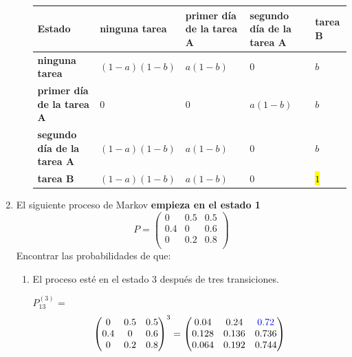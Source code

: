 \documentclass{templateNote}
\begin{document}
\begin{enumerate}[start = 3]
\begin{enumerate}[label = \alph*)]
\begin{center}
            \begin{table}[h]
                \centering
                \begin{tabularx}{\textwidth}{|X|X|X|X|X|}
                    \hline
                    \textbf{Estado} & \textbf{ninguna tarea} & \textbf{primer día de la tarea A} & \textbf{segundo día de la tarea A} & \textbf{tarea B} \\ \hline
                    \textbf{ninguna tarea} & $(1-a)(1-b)$ & $a(1-b)$ & $0$ & $b$ \\ \hline
                    \textbf{primer día de la tarea A} & $0$ & $0$ & $a(1-b)$ & $b$ \\ \hline
                    \textbf{segundo día de la tarea A} & $(1-a)(1-b)$ & $a(1-b)$ & $0$ & $b$ \\ \hline
                    \textbf{tarea B} & $(1-a)(1-b)$ & $a(1-b)$ & $0$ & \hl{$1$}\\ \hline
                \end{tabularx}
            \end{table}

        \end{center}

        
    
    \end{enumerate}

    \newpage
    \item El siguiente proceso de Markov \textbf{empieza en el estado 1}
    \[
    P = \begin{pmatrix}
        0   & 0.5 & 0.5 \\
        0.4 & 0   & 0.6 \\
        0   & 0.2 & 0.8 \\
    \end{pmatrix}
    \]
    Encontrar las probabilidades de que:
    \begin{enumerate}[label=\alph*)]
        \item El proceso esté en el estado 3 después de tres transiciones.

        $P_{13}^{(3)}$ = 
        \[
        \begin{pmatrix}
            0   & 0.5 & 0.5 \\
            0.4 & 0   & 0.6 \\
            0   & 0.2 & 0.8 \\
        \end{pmatrix}^3
        =
        \begin{pmatrix}
            0.04 & 0.24 & \textcolor{blue}{0.72} \\
            0.128 & 0.136 & 0.736 \\ 
            0.064 & 0.192 & 0.744 \\
        \end{pmatrix}
        \]


\end{enumerate}
\end{enumerate}
\end{document}
